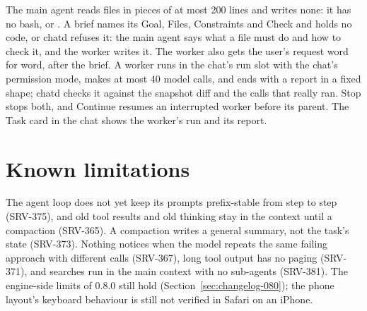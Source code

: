 The main agent reads files in pieces of at most 200 lines and writes none: it has no bash,  or . A brief names its Goal, Files, Constraints and Check and holds no code, or chatd refuses it: the main agent says what a file must do and how to check it, and the worker writes it. The worker also gets the user's request word for word, after the brief. A worker runs in the chat's run slot with the chat's permission mode, makes at most 40 model calls, and ends with a report in a fixed shape; chatd checks it against the snapshot diff and the calls that really ran. Stop stops both, and Continue resumes an interrupted worker before its parent. The Task card in the chat shows the worker's run and its report.

\section{Known limitations}\label{sec:chat-limits}

The agent loop does not yet keep its prompts prefix-stable from step to step (SRV-375), and old tool results and old thinking stay in the context until a compaction (SRV-365). A compaction writes a general summary, not the task's state (SRV-373). Nothing notices when the model repeats the same failing approach with different calls (SRV-367), long tool output has no paging (SRV-371), and searches run in the main context with no sub-agents (SRV-381). The engine-side limits of 0.8.0 still hold (Section~\ref{sec:changelog-080}); the phone layout's keyboard behaviour is still not verified in Safari on an iPhone.
